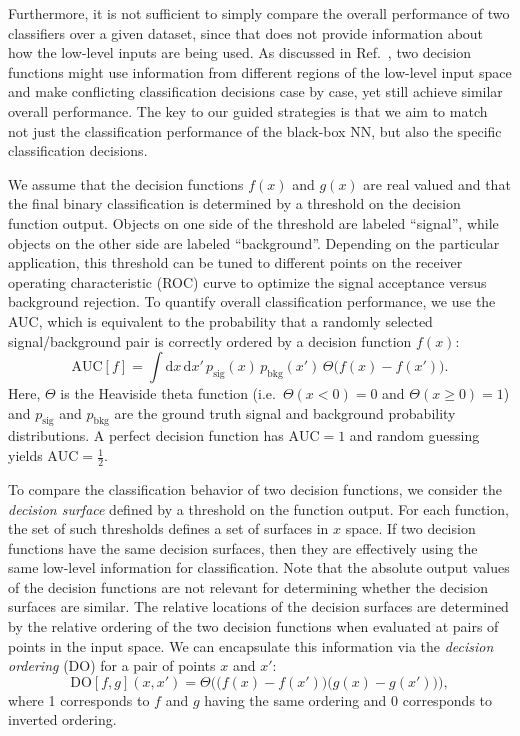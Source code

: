 \documentclass[aps,prd,twocolumn,superscriptaddress,preprintnumbers,nofootinbib,longbibliography,floatfix]{revtex4-1}
\newcommand{\DO}{\text{DO}}
\newcommand{\AUC}{\text{AUC}}
\newcommand{\rref}[1]{Ref.~\cite{#1}}
\begin{document}
Furthermore, it is not sufficient to simply compare the overall performance of two classifiers over a given dataset, since that does not provide information about how the low-level  inputs are being used. As discussed in \rref{Larkoski:2014pca}, two decision functions might use information from different regions of the low-level  input space and make conflicting classification decisions case by case, yet still achieve similar overall performance. The key to our guided strategies is that we aim to match not just the classification performance of the black-box NN, but also the specific classification decisions.

We assume that the decision functions $f(x)$ and $g(x)$ are real valued and that the final binary classification is determined by a threshold on the decision function output. Objects on one side of the threshold are labeled ``signal'', while objects on the other side are labeled ``background''. Depending on the particular application, this threshold can be tuned to different points on the receiver operating characteristic (ROC) curve to optimize the signal acceptance versus background rejection. To quantify overall classification performance, we use the AUC, which is equivalent to the probability that a randomly selected signal/background pair is correctly ordered by a decision function $f(x)$:
\begin{equation}
	\label{eq:AUC}
	\AUC[f]  = \int \mathrm{d}x\, \mathrm{d}x'\, p_{\text{sig}}(x) \, p_{\text{bkg}} (x') \, \Theta \big( f(x) - f(x') \big).
\end{equation}
Here, $\Theta$ is the Heaviside theta function (i.e.~$\Theta(x<0) =  0$ and $\Theta(x\ge 0) = 1$) and $p_{\text{sig}}$ and $p_{\text{bkg}}$ are the ground truth signal and background probability distributions. A perfect decision function has $\AUC = 1$ and random guessing yields $\AUC = \frac{1}{2}$.


To compare the classification behavior of two decision functions, we consider the \emph{decision surface} defined by a threshold on the function output. For each function, the set of such thresholds defines a set of surfaces in $x$ space. If two decision functions have the same decision surfaces, then they are effectively using the same low-level  information for classification. Note that the absolute output values of the decision functions are not relevant for determining whether the decision surfaces are similar. The relative locations of the decision surfaces are determined by the relative ordering of the two decision functions when evaluated at pairs of points in the input space. We can encapsulate this information via the \emph{decision ordering} (DO) for a pair of points $x$ and $x'$:
\begin{equation}
\label{eq:DO_def}
	\DO[f,g](x,x') = \Theta \Big( \big( f(x) - f(x') \big) \big( g(x) - g(x') \big) \Big),
\end{equation}
where 1 corresponds to $f$ and $g$ having the same ordering and 0 corresponds to inverted ordering.
\end{document}
